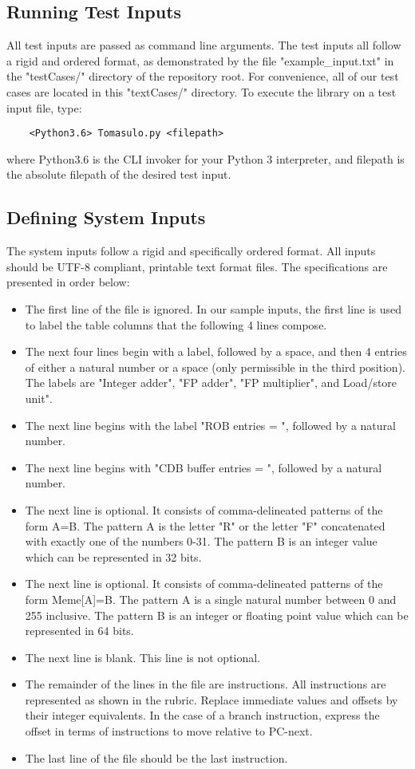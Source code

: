 \documentclass[12pt]{article}
\begin{document}
\subsection{Running Test Inputs}
All test inputs are passed as command line arguments.  The test inputs all follow a rigid and ordered format, as demonstrated by the file "example\_input.txt" in the "testCases/" directory of the repository root.  For convenience, all of our test cases are located in this "textCases/" directory.  To execute the library on a test input file, type:
\begin{verbatim}
    <Python3.6> Tomasulo.py <filepath>
\end{verbatim}
where Python3.6 is the CLI invoker for your Python 3 interpreter, and filepath is the absolute filepath of the desired test input.

\subsection{Defining System Inputs}
The system inputs follow a rigid and specifically ordered format.  All inputs should be UTF-8 compliant, printable text format files.  The specifications are presented in order below:
\begin{itemize}
    \item The first line of the file is ignored.  In our sample inputs, the first line is used to label the table columns that the following 4 lines compose.
    \item The next four lines begin with a label, followed by a space, and then 4 entries of either a natural number or a space (only permissible in the third position).  The labels are "Integer adder", "FP adder", "FP multiplier", and Load/store unit".
    \item The next line begins with the label "ROB entries = ", followed by a natural number.
    \item The next line begins with "CDB buffer entries = ", followed by a natural number.
    \item The next line is optional.  It consists of comma-delineated patterns of the form A=B.  The pattern A is the letter "R" or the letter "F" concatenated with exactly one of the numbers 0-31.  The pattern B is an integer value which can be represented in 32 bits.
    \item The next line is optional.  It consists of comma-delineated patterns of the form Meme[A]=B.  The pattern A is a single natural number between 0 and 255 inclusive.  The pattern B is an integer or floating point value which can be represented in 64 bits.
    \item The next line is blank.  This line is not optional.
    \item The remainder of the lines in the file are instructions.  All instructions are represented as shown in the rubric.  Replace immediate values and offsets by their integer equivalents.  In the case of a branch instruction, express the offset in terms of instructions to move relative to PC-next.
    \item The last line of the file should be the last instruction.
\end{itemize}
\end{document}
